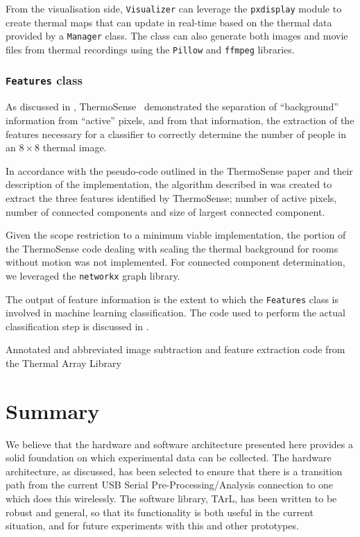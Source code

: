\documentclass[../thesis/thesis.tex]{subfiles}
\begin{document}
From the visualisation side, \texttt{Visualizer} can leverage the \texttt{pxdisplay} module to create thermal maps that can update in real-time based on the thermal data provided by a \texttt{Manager} class. The class can also generate both images and movie files from thermal recordings using the \texttt{Pillow} and \texttt{ffmpeg} libraries.

\subsubsection*{\texttt{Features} class}
As discussed in , ThermoSense~\cite{beltran2013thermosense} demonstrated the separation of ``background'' information from ``active'' pixels, and from that information, the extraction of the features necessary for a classifier to correctly determine the number of people in an $8\times8$ thermal image.

In accordance with the pseudo-code outlined in the ThermoSense paper and their description of the implementation, the algorithm described in  was created to extract the three features identified by ThermoSense; number of active pixels, number of connected components and size of largest connected component.

Given the scope restriction to a minimum viable implementation, the portion of the ThermoSense code dealing with scaling the thermal background for rooms without motion was not implemented. For connected component determination, we leveraged the \texttt{networkx} graph library.

The output of feature information is the extent to which the \texttt{Features} class is involved in machine learning classification. The code used to perform the actual classification step is discussed in .

\begin{listing}
\centering

\caption{Annotated and abbreviated image subtraction and feature extraction code from the Thermal Array Library}
\label{lst:exps:featcode}
\end{listing}

\section{Summary}
We believe that the hardware and software architecture presented here provides a solid foundation on which experimental data can be collected. The hardware architecture, as discussed, has been selected to ensure that there is a transition path from the current USB Serial Pre-Processing/Analysis connection to one which does this wirelessly. The software library, TArL, has been written to be robust and general, so that its functionality is both useful in the current situation, and for future experiments with this and other prototypes.
 
\end{document}
